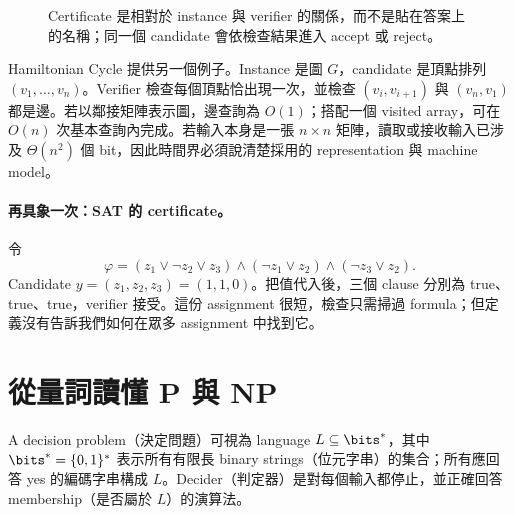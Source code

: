 \documentclass[11pt,a4paper,oneside,openany]{book}
\begin{document}
\begin{figure}[htbp]
\centering
{}
\caption{Certificate 是相對於 instance 與 verifier 的關係，而不是貼在答案上的名稱；同一個 candidate 會依檢查結果進入 accept 或 reject。}
\label{fig:verifier-gate}
\end{figure}

Hamiltonian Cycle 提供另一個例子。Instance 是圖 $G$，candidate 是頂點排列 $(v_1,\ldots,v_n)$。Verifier 檢查每個頂點恰出現一次，並檢查 $(v_i,v_{i+1})$ 與 $(v_n,v_1)$ 都是邊。若以鄰接矩陣表示圖，邊查詢為 $O(1)$；搭配一個 visited array，可在 $O(n)$ 次基本查詢內完成。若輸入本身是一張 $n\times n$ 矩陣，讀取或接收輸入已涉及 $\Theta(n^2)$ 個 bit，因此時間界必須說清楚採用的 representation 與 machine model。

\paragraph{再具象一次：SAT 的 certificate。}
令
\[
 \varphi=(z_1\lor \neg z_2\lor z_3)\land(\neg z_1\lor z_2)
             \land(\neg z_3\lor z_2).
\]
Candidate $y=(z_1,z_2,z_3)=(1,1,0)$。把值代入後，三個 clause 分別為 true、true、true，verifier 接受。這份 assignment 很短，檢查只需掃過 formula；但定義沒有告訴我們如何在眾多 assignment 中找到它。

\section{從量詞讀懂 P 與 NP}
A decision problem（決定問題）可視為 language $L\subseteq\bits^*$，其中 $\bits^*=\{0,1\}^*$ 表示所有有限長 binary strings（位元字串）的集合；所有應回答 yes 的編碼字串構成 $L$。Decider（判定器）是對每個輸入都停止，並正確回答 membership（是否屬於 $L$）的演算法。
\end{document}
